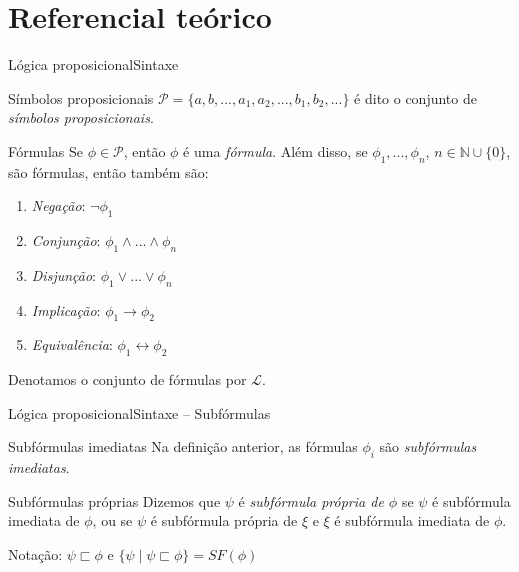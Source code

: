 
\section{Referencial teórico}

\begin{frame}{Lógica proposicional}{Sintaxe}
	\vspace{-.2cm}
	\begin{footnotesize}
	\begin{block}{Símbolos proposicionais}
		$\mathcal{P} = \{a,b,...,a_1,a_2,...,b_1,b_2,... \}$ é dito o conjunto de \emph{símbolos proposicionais}.
	\end{block}
	\pause
	\vspace{-.2cm}
	\begin{block}{Fórmulas}
		Se $\phi \in \mathcal{P}$, então $\phi$ é uma \emph{fórmula}. Além disso, se $\phi_1,...,\phi_n$, $n \in \mathbb{N} \cup \{0 \}$, são fórmulas, então também são:
		\begin{enumerate}
			\pause\item \emph{Negação}: $\neg \phi_1$
			\pause\item \emph{Conjunção}: $\phi_1 \wedge ... \wedge \phi_n$
			\pause\item \emph{Disjunção}: $\phi_1 \vee ... \vee \phi_n$
			\pause\item \emph{Implicação}: $\phi_1 \rightarrow \phi_2$
			\pause\item \emph{Equivalência}: $\phi_1 \leftrightarrow \phi_2$
		\end{enumerate}
		\pause Denotamos o conjunto de fórmulas por $\mathcal{L}$.
	\end{block}
	\end{footnotesize}
\end{frame}

\begin{frame}{Lógica proposicional}{Sintaxe -- Subfórmulas}
	\begin{block}{Subfórmulas imediatas}
		Na definição anterior, as fórmulas $\phi_i$ são \emph{subfórmulas imediatas}.
	\end{block}
	
	\pause
	\begin{block}{Subfórmulas próprias}
		Dizemos que $\psi$ é \emph{subfórmula própria de $\phi$} se $\psi$ é subfórmula imediata de $\phi$, ou se $\psi$ é subfórmula própria de $\xi$ e $\xi$ é subfórmula imediata de $\phi$.
		
		\pause Notação: $\psi \sqsubset \phi$ e $\{\psi \mid \psi \sqsubset \phi \} = SF(\phi)$
	\end{block}
\end{frame}


